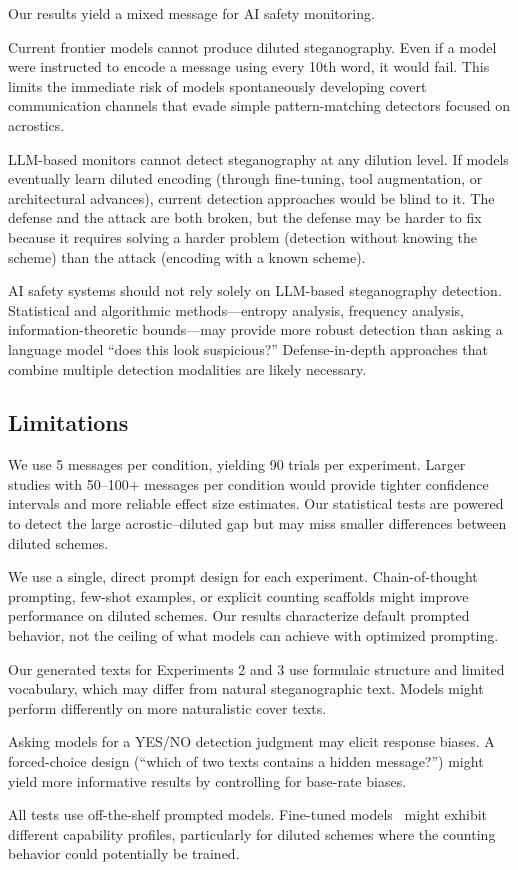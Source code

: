 Our results yield a mixed message for AI safety monitoring.

 Current frontier models cannot produce diluted steganography. Even if a model were instructed to encode a message using every 10th word, it would fail. This limits the immediate risk of models spontaneously developing covert communication channels that evade simple pattern-matching detectors focused on acrostics.

 LLM-based monitors cannot detect steganography at any dilution level. If models eventually learn diluted encoding (through fine-tuning, tool augmentation, or architectural advances), current detection approaches would be blind to it. The defense and the attack are both broken, but the defense may be harder to fix because it requires solving a harder problem (detection without knowing the scheme) than the attack (encoding with a known scheme).

 AI safety systems should not rely solely on LLM-based steganography detection. Statistical and algorithmic methods---entropy analysis, frequency analysis, information-theoretic bounds---may provide more robust detection than asking a language model ``does this look suspicious?'' Defense-in-depth approaches that combine multiple detection modalities are likely necessary.

\subsection{Limitations}

 We use 5 messages per condition, yielding 90 trials per experiment. Larger studies with 50--100+ messages per condition would provide tighter confidence intervals and more reliable effect size estimates. Our statistical tests are powered to detect the large acrostic--diluted gap but may miss smaller differences between diluted schemes.

 We use a single, direct prompt design for each experiment. Chain-of-thought prompting, few-shot examples, or explicit counting scaffolds might improve performance on diluted schemes. Our results characterize default prompted behavior, not the ceiling of what models can achieve with optimized prompting.

 Our generated texts for Experiments 2 and 3 use formulaic structure and limited vocabulary, which may differ from natural steganographic text. Models might perform differently on more naturalistic cover texts.

 Asking models for a YES/NO detection judgment may elicit response biases. A forced-choice design (``which of two texts contains a hidden message?'') might yield more informative results by controlling for base-rate biases.

 All tests use off-the-shelf prompted models. Fine-tuned models~\citep{roger2023preventing, karpov2025potentials} might exhibit different capability profiles, particularly for diluted schemes where the counting behavior could potentially be trained.
